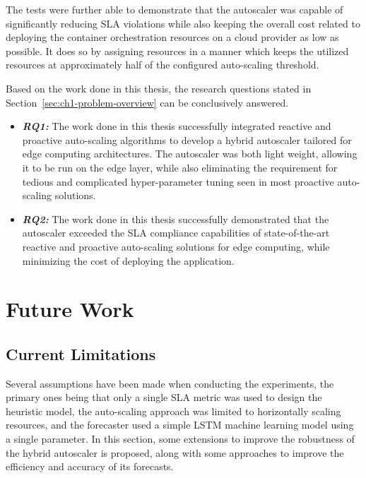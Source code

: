 The tests were further able to demonstrate that the autoscaler was capable of significantly reducing SLA violations while also keeping the overall cost related to deploying the container orchestration resources on a cloud provider as low as possible. It does so by assigning resources in a manner which keeps the utilized resources at approximately half of the configured auto-scaling threshold.\par

Based on the work done in this thesis, the research questions stated in Section~\ref{sec:ch1-problem-overview} can be conclusively answered.

\begin{itemize}
    \item \textbf{\textit{RQ1:}} The work done in this thesis successfully integrated reactive and proactive auto-scaling algorithms to develop a hybrid autoscaler tailored for edge computing architectures. The autoscaler was both light weight, allowing it to be run on the edge layer, while also eliminating the requirement for tedious and complicated hyper-parameter tuning seen in most proactive auto-scaling solutions.
    \item \textbf{\textit{RQ2:}} The work done in this thesis successfully demonstrated that the autoscaler exceeded the SLA compliance capabilities of state-of-the-art reactive and proactive auto-scaling solutions for edge computing, while minimizing the cost of deploying the application.
\end{itemize}

\section{Future Work}
\label{sec:ch7-future-work}

\subsection{Current Limitations}
\label{subsec:ch7-limitations}

Several assumptions have been made when conducting the experiments, the primary ones being that only a single SLA metric was used to design the heuristic model, the auto-scaling approach was limited to horizontally scaling resources, and the forecaster used a simple LSTM machine learning model using a single parameter. In this section, some extensions to improve the robustness of the hybrid autoscaler is proposed, along with some approaches to improve the efficiency and accuracy of its forecasts.\par


